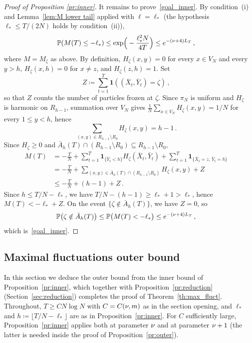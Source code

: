 \documentclass[11pt,a4paper,reqno]{amsart}
\theoremstyle{definition}
\newcommand{\bbP}{{\ensuremath{\mathbb P}} }
\begin{document}
\begin{proof}[Proof of Proposition \ref{pr:inner}]
It remains to prove~\eqref{goal_inner}. By condition~(i) and Lemma~\ref{lem:M lower tail} applied with $\ell = \ell_*$ (the hypothesis $\ell_* \leq T/(2N)$ holds by condition~(ii)),
$$ \bbP( M(T) \leq -\ell_* ) \leq \exp\!\Big( -\frac{\ell_*^2 N}{4T} \Big) \leq e^{-(\n + 4) L_T}\,, $$
where $M = M_\zeta$ as above.
By definition, $H_\zeta(x,y) = 0$ for every $x \in V_N$ and every $y > h$, $H_\zeta(x, h) = 0$ for $x \neq z$, and $H_\zeta(z, h) = 1$.
Set
	\[ Z \coloneqq \sum_{t=1}^T \mathbf{1}( (\bar X_t, \bar Y_t) = \zeta )\,, \]
so that $Z$ counts the number of particles frozen at $\zeta$.
Since $\pi_N$ is uniform and $H_\zeta$ is harmonic on $R_{h-1}$, summation over $V_N$ gives $\frac{1}{N}\sum_{x \in V_N} H_\zeta(x, y) = 1/N$ for every $1 \leq y < h$, hence
	\[ \sum_{(x,y) \in R_{h-1} \setminus R_0} H_\zeta(x, y) = h - 1\,. \]
Since $H_\zeta \geq 0$ and $\bar A_h(T) \cap (R_{h-1} \setminus R_0) \subseteq R_{h-1} \setminus R_0$,
\begin{align*}
M(T)
& = -\frac{T}{N} + \sum_{t=1}^T \mathbf{1}_{\{\bar Y_t < h\}} H_\zeta(\bar X_t, \bar Y_t) + \sum_{t=1}^T \mathbf{1}_{\{\bar X_t = z,\, \bar Y_t = h\}}
\\ & = -\frac{T}{N} + \sum_{(x,y) \in \bar A_h(T) \cap (R_{h-1} \setminus R_0)} H_\zeta(x, y) + Z
\\ & \leq -\frac{T}{N} + (h-1) + Z\,.
\end{align*}
Since $h \leq T/N - \ell_*$, we have $T/N - (h - 1) \geq \ell_* + 1 > \ell_*$, hence $M(T) < -\ell_* + Z$. On the event $\{ \zeta \notin \bar A_h(T) \}$, we have $Z = 0$, so
	\[ \bbP\big( \zeta \notin \bar A_h(T) \big) \leq \bbP\big( M(T) < -\ell_* \big) \leq e^{-(\n + 4) L_T}\,, \]
which is~\eqref{goal_inner}.


\end{proof}

\medskip 

\subsection{Maximal fluctuations outer bound} \label{sec:outer}
In this section we deduce the outer bound from the inner bound of Proposition~\ref{pr:inner}, which together with Proposition~\ref{pr:reduction} (Section~\ref{sec:reduction}) completes the proof of Theorem~\ref{th:max_fluct}. Throughout, $T \geq C N\log N$ with $C = C(\nu, m)$ as in the section opening, and $\ell_*$ and $h \coloneqq \lfloor T/N - \ell_*\rfloor$ are as in Proposition~\ref{pr:inner}. For $C$ sufficiently large, Proposition~\ref{pr:inner} applies both at parameter $\nu$ and at parameter $\nu+1$ (the latter is needed inside the proof of Proposition~\ref{pr:outer}).
\end{document}
